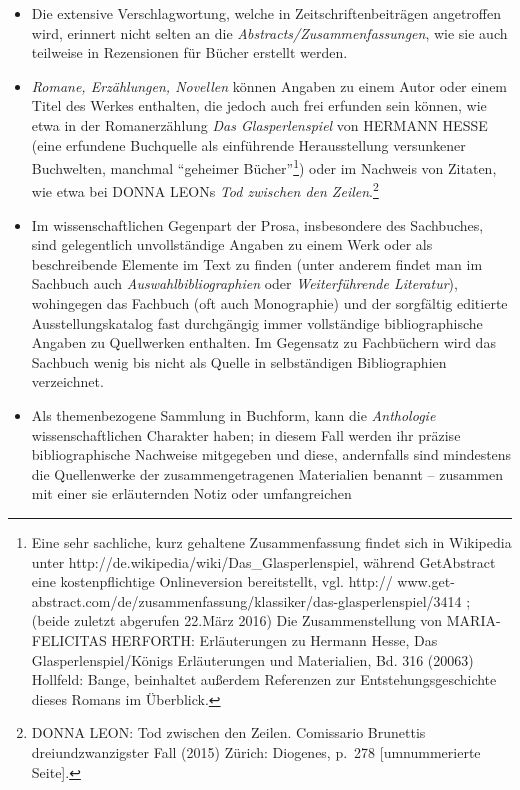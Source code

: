 \documentclass[a4paper,
fontsize=11pt,
oneside,
numbers=noperiodatend,
parskip=half-,
bibliography=totoc,
final
]{scrartcl}
\begin{document}
\begin{itemize}
\item
  Die extensive Verschlagwortung, welche in Zeitschriftenbeiträgen
  angetroffen wird, erinnert nicht selten an die
  \emph{Abstracts/Zusammenfassungen}, wie sie auch teilweise in
  Rezensionen für Bücher erstellt werden.
\item
  \emph{Romane, Erzählungen, Novellen} können Angaben zu einem Autor
  oder einem Titel des Werkes enthalten, die jedoch auch frei erfunden
  sein können, wie etwa in der Romanerzählung \emph{Das Glasperlenspiel}
  von HERMANN HESSE (eine erfundene Buchquelle als einführende
  Herausstellung versunkener Buchwelten, manchmal \enquote{geheimer
  Bücher}\footnote{Eine sehr sachliche, kurz gehaltene Zusammenfassung
    findet sich in Wikipedia unter
    http://de.wikipedia/wiki/Das\_Glasperlenspiel, während GetAbstract
    eine kostenpflichtige Onlineversion bereitstellt, vgl. http://
    www.get-abstract.com/de/zusammenfassung/klassiker/das-glasperlenspiel/3414
    ; (beide zuletzt abgerufen 22.März 2016) Die Zusammenstellung von
    MARIA-FELICITAS HERFORTH: Erläuterungen zu Hermann Hesse, Das
    Glasperlenspiel/Königs Erläuterungen und Materialien, Bd. 316
    (20063) Hollfeld: Bange, beinhaltet außerdem Referenzen zur
    Entstehungsgeschichte dieses Romans im Überblick.}) oder im Nachweis
  von Zitaten, wie etwa bei DONNA LEONs \emph{Tod zwischen den
  Zeilen}.\footnote{DONNA LEON: Tod zwischen den Zeilen. Comissario
    Brunettis dreiundzwanzigster Fall (2015) Zürich: Diogenes, p.~278
    {[}umnummerierte Seite{]}.}
\item
  Im wissenschaftlichen Gegenpart der Prosa, insbesondere des
  Sachbuches, sind gelegentlich unvollständige Angaben zu einem Werk
  oder als beschreibende Elemente im Text zu finden (unter anderem
  findet man im Sachbuch auch \emph{Auswahlbibliographien} oder
  \emph{Weiterführende Literatur}), wohingegen das Fachbuch (oft auch
  Monographie) und der sorgfältig editierte Ausstellungskatalog fast
  durchgängig immer vollständige bibliographische Angaben zu Quellwerken
  enthalten. Im Gegensatz zu Fachbüchern wird das Sachbuch wenig bis
  nicht als Quelle in selbständigen Bibliographien verzeichnet.
\item
  Als themenbezogene Sammlung in Buchform, kann die \emph{Anthologie}
  wissenschaftlichen Charakter haben; in diesem Fall werden ihr präzise
  bibliographische Nachweise mitgegeben und diese, andernfalls sind
  mindestens die Quellenwerke der zusammengetragenen Materialien benannt
  -- zusammen mit einer sie erläuternden Notiz oder umfangreichen

\end{itemize}
\end{document}

